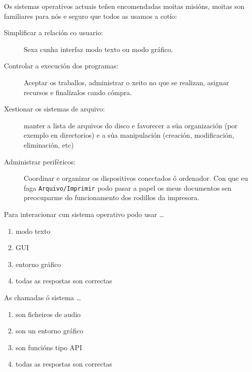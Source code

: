 \begin{singlespace}
Os sistemas operativos actuais teñen encomendadas moitas  misións, moitas son familiares para nós e seguro que todos as usamos a cotío:

\begin{description}
\item[Simplificar a relación co usuario:] Sexa cunha interfaz modo texto ou modo gráfico.
\item[Controlar a execución dos programas: ] Aceptar os traballos, administrar o xeito no que se realizan, asignar recursos e finalízalos cando cómpra.
\item[Xestionar os sistemas de arquivo:] manter a lista de arquivos do disco e favorecer a súa organización (por exemplo en directorios) e a súa manipulación (creación, modificación, eliminación, etc)
\item[Administrar periféricos:] Coordinar e organizar os dispositivos conectados ó ordenador. Con que eu faga \texttt{Arquivo/Imprimir} podo pasar a papel os meus documentos sen preocuparme do funcionamento dos rodillos da impresora.
\end{description}


\begin{diapo}\begin{frame}{Para interacionar cun sistema operativo podo usar  \dots}
\begin{enumerate}
\item  modo texto \pause
\item GUI \pause
\item entorno gráfico  \pause
\item todas as respostas son correctas
\end{enumerate}
\end{frame}
\end{diapo}
\begin{diapo}
\begin{frame}{As chamadas ó sistema \dots}
\begin{enumerate}
\item  son ficheiros de audio \pause
\item son un entorno gráfico \pause
\item son funcións tipo API  \pause
\item todas as respostas son correctas
\end{enumerate}
\end{frame}
\end{diapo}


\end{singlespace}
